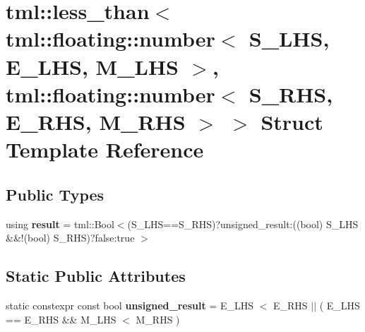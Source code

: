 \hypertarget{structtml_1_1less__than_3_01tml_1_1floating_1_1number_3_01_s___l_h_s_00_01_e___l_h_s_00_01_m___lcb9557b4b211b2239ec258c19e7ce7f0}{\section{tml\+:\+:less\+\_\+than$<$ tml\+:\+:floating\+:\+:number$<$ S\+\_\+\+L\+H\+S, E\+\_\+\+L\+H\+S, M\+\_\+\+L\+H\+S $>$, tml\+:\+:floating\+:\+:number$<$ S\+\_\+\+R\+H\+S, E\+\_\+\+R\+H\+S, M\+\_\+\+R\+H\+S $>$ $>$ Struct Template Reference}
\label{structtml_1_1less__than_3_01tml_1_1floating_1_1number_3_01_s___l_h_s_00_01_e___l_h_s_00_01_m___lcb9557b4b211b2239ec258c19e7ce7f0}
}
\subsection*{Public Types}
\begin{DoxyCompactItemize}
\item 
\hypertarget{structtml_1_1less__than_3_01tml_1_1floating_1_1number_3_01_s___l_h_s_00_01_e___l_h_s_00_01_m___lcb9557b4b211b2239ec258c19e7ce7f0_ade93e70160bb0879d08fc3fa4570ab94}{using {\bfseries result} = tml\+::\+Bool$<$(S\+\_\+\+L\+H\+S==S\+\_\+\+R\+H\+S)?unsigned\+\_\+result\+:((bool) S\+\_\+\+L\+H\+S \&\&!(bool) S\+\_\+\+R\+H\+S)?false\+:true $>$}\label{structtml_1_1less__than_3_01tml_1_1floating_1_1number_3_01_s___l_h_s_00_01_e___l_h_s_00_01_m___lcb9557b4b211b2239ec258c19e7ce7f0_ade93e70160bb0879d08fc3fa4570ab94}

\end{DoxyCompactItemize}
\subsection*{Static Public Attributes}
\begin{DoxyCompactItemize}
\item 
\hypertarget{structtml_1_1less__than_3_01tml_1_1floating_1_1number_3_01_s___l_h_s_00_01_e___l_h_s_00_01_m___lcb9557b4b211b2239ec258c19e7ce7f0_a69a0279d67e0ffb3b0b3f6304c048ce2}{static constexpr const bool {\bfseries unsigned\+\_\+result} = E\+\_\+\+L\+H\+S $<$ E\+\_\+\+R\+H\+S $\vert$$\vert$ ( E\+\_\+\+L\+H\+S == E\+\_\+\+R\+H\+S \&\& M\+\_\+\+L\+H\+S $<$ M\+\_\+\+R\+H\+S )}\label{structtml_1_1less__than_3_01tml_1_1floating_1_1number_3_01_s___l_h_s_00_01_e___l_h_s_00_01_m___lcb9557b4b211b2239ec258c19e7ce7f0_a69a0279d67e0ffb3b0b3f6304c048ce2}

\end{DoxyCompactItemize}



